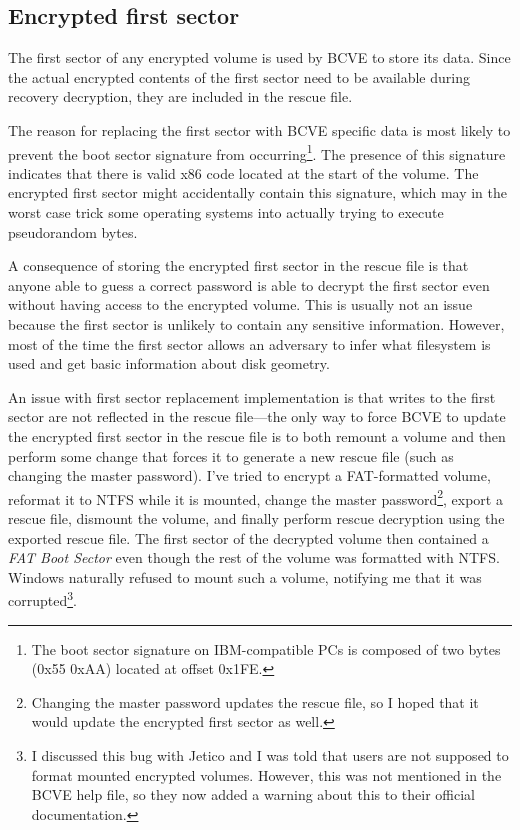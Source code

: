 \documentclass[thesis=B,english]{FITthesis}[2012/10/20]
\begin{document}
	\subsection{Encrypted first sector}
	
	The first sector of any encrypted volume is used by BCVE to store its data. Since the actual encrypted contents of the first sector need to be available during recovery decryption, they are included in the rescue file.
	
	The reason for replacing the first sector with BCVE specific data is most likely to prevent the boot sector signature from occurring\footnote{The boot sector signature on IBM-compatible PCs is composed of two bytes (0x55 0xAA) located at offset 0x1FE.}. The presence of this signature indicates that there is valid x86 code located at the start of the volume. The encrypted first sector might accidentally contain this signature, which may in the worst case trick some operating systems into actually trying to execute pseudorandom bytes.
	
	A consequence of storing the encrypted first sector in the rescue file is that anyone able to guess a correct password is able to decrypt the first sector even without having access to the encrypted volume. This is usually not an issue because the first sector is unlikely to contain any sensitive information. However, most of the time the first sector allows an adversary to infer what filesystem is used and get basic information about disk geometry.
	
	An issue with first sector replacement implementation is that writes to the first sector are not reflected in the rescue file---the only way to force BCVE to update the encrypted first sector in the rescue file is to both remount a volume and then perform some change that forces it to generate a new rescue file (such as changing the master password). I've tried to encrypt a FAT-formatted volume, reformat it to NTFS while it is mounted, change the master password\footnote{Changing the master password updates the rescue file, so I hoped that it would update the encrypted first sector as well.}, export a rescue file, dismount the volume, and finally perform rescue decryption using the exported rescue file. The first sector of the decrypted volume then contained a \textit{FAT Boot Sector} even though the rest of the volume was formatted with NTFS. Windows naturally refused to mount such a volume, notifying me that it was corrupted\footnote{I discussed this bug with Jetico and I was told that users are not supposed to format mounted encrypted volumes. However, this was not mentioned in the BCVE help file, so they now added a warning about this to their official documentation.}.
	
\end{document}
